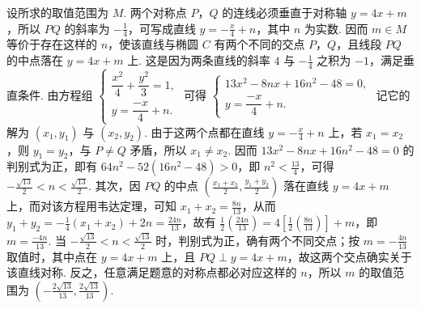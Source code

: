 \documentclass[UTF8,a4paper,oneside,11pt]{ctexbook}
\begin{document}
\begin{solution}

设所求的取值范围为 \(M\). 两个对称点 \(P\)，\(Q\) 的连线必须垂直于对称轴 \(y=4x+m\)，所以 \(PQ\) 的斜率为 \(-\frac14\)，可写成直线 \(y=-\frac{x}{4}+n\)，其中 \(n\) 为实数. 因而 \(m\in M\) 等价于存在这样的 \(n\)，使该直线与椭圆 \(C\) 有两个不同的交点 \(P\)，\(Q\)，且线段 \(PQ\) 的中点落在 \(y=4x+m\) 上. 这是因为两条直线的斜率 \(4\) 与 \(-\frac14\) 之积为 \(-1\)，满足垂直条件. 由方程组 \(\begin{cases}
\dfrac{x^{2}}{4}+\dfrac{y^{2}}{3}=1,\\
y=\dfrac{-x}{4}+n.
\end{cases}\) 可得 \(\begin{cases}
13x^{2}-8nx+16n^{2}-48=0,\\
y=\dfrac{-x}{4}+n.
\end{cases}\)
记它的解为 \((x_{1}, y_{1}) \) 与 \((x_{2}, y_{2}) \). 由于这两个点都在直线 \(y=-\frac{x}{4}+n\) 上，若 \(x_{1}=x_{2}\)，则 \(y_{1}=y_{2}\)，与 \(P\ne Q\) 矛盾，所以 \(x_{1}\ne x_{2}\). 因而
\(13x^{2}-8nx+16n^{2}-48=0\) 的判别式为正，即有 \(64n^{2}-52(16n^{2}-48)>0\)，即 \(n^{2}<\frac{13}{4}\)，可得 \(-\frac{\sqrt{13}}{2}<n<\frac{\sqrt{13}}{2}\). 其次，因 \(PQ\) 的中点 \(\left(\frac{x_{1}+x_{2}}{2},\frac{y_{1}+y_{2}}{2}\right)\) 落在直线 \(y=4x+m\) 上，而对该方程用韦达定理，可知 \(x_{1}+x_{2}=\frac{8n}{13}\)，从而 \(y_{1}+y_{2}=-\frac{1}{4}(x_{1}+x_{2})+2n=\frac{24n}{13}\)，故有 \(\frac{1}{2}\left(\frac{24n}{13}\right)=4\left[\frac{1}{2}\left(\frac{8n}{13}\right)\right]+m\)，即 \(m=\frac{-4n}{13}\). 当 \(-\frac{\sqrt{13}}{2}<n<\frac{\sqrt{13}}{2}\) 时，判别式为正，确有两个不同交点；按 \(m=-\frac{4n}{13}\) 取值时，其中点在 \(y=4x+m\) 上，且 \(PQ\perp y=4x+m\)，故这两个交点确实关于该直线对称. 反之，任意满足题意的对称点都必对应这样的 \(n\)，所以 \(m\) 的取值范围为 \(\left(-\frac{2\sqrt{13}}{13},\frac{2\sqrt{13}}{13}\right)\).
\end{solution}

\end{document}
